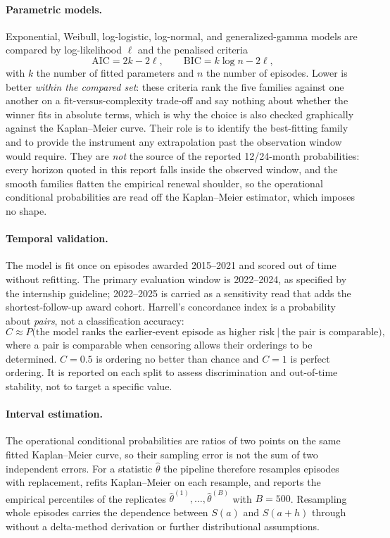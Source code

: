 \documentclass[11pt,a4paper]{article}
\begin{document}
\paragraph{Parametric models.} Exponential, Weibull, log-logistic, log-normal,
and generalized-gamma models are compared by log-likelihood \(\ell\) and the
penalised criteria
\[
\mathrm{AIC}=2k-2\ell,
\qquad
\mathrm{BIC}=k\log n-2\ell ,
\]
with \(k\) the number of fitted parameters and \(n\) the number of episodes.
Lower is better \emph{within the compared set}: these criteria rank the five
families against one another on a fit-versus-complexity trade-off and say
nothing about whether the winner fits in absolute terms, which is why the choice
is also checked graphically against the Kaplan--Meier curve. Their role is to
identify the best-fitting family and to provide the instrument any extrapolation
past the observation window would require. They are \emph{not} the source of
the reported 12/24-month probabilities: every horizon quoted in this report
falls inside the observed window, and the smooth families flatten the empirical
renewal shoulder, so the operational conditional probabilities are read off the
Kaplan--Meier estimator, which imposes no shape.

\paragraph{Temporal validation.} The model is fit once on episodes awarded
2015--2021 and scored out of time without refitting. The primary evaluation
window is 2022--2024, as specified by the internship guideline; 2022--2025 is
carried as a sensitivity read that adds the shortest-follow-up award cohort.
Harrell's concordance index is a probability about \emph{pairs}, not a
classification accuracy:
\[
C\approx P\big(\text{the model ranks the earlier-event episode as higher risk}
\ \big|\ \text{the pair is comparable}\big),
\]
where a pair is comparable when censoring allows their orderings to be
determined. \(C=0.5\) is ordering no better than chance and \(C=1\) is perfect
ordering. It is reported on each split to assess discrimination and out-of-time
stability, not to target a specific value.

\paragraph{Interval estimation.} The operational conditional probabilities are
ratios of two points on the same fitted Kaplan--Meier curve, so their sampling
error is not the sum of two independent errors. For a statistic
\(\hat{\theta}\) the pipeline therefore resamples episodes with replacement,
refits Kaplan--Meier on each resample, and reports the empirical percentiles of
the replicates \(\hat{\theta}^{(1)},\dots,\hat{\theta}^{(B)}\) with
\(B=500\). Resampling whole episodes carries the dependence between \(S(a)\) and
\(S(a+h)\) through without a delta-method derivation or further distributional
assumptions.
\end{document}
